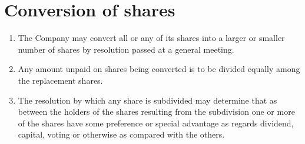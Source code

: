 \section{Conversion of shares}

\begin{enumerate}[label=(\alph*)]
    \item The Company may convert all or any of its shares into a larger or smaller number of shares by resolution passed at a general meeting.
    
    \item Any amount unpaid on shares being converted is to be divided equally among the replacement shares.
    
    \item The resolution by which any share is subdivided may determine that as between the holders of the shares resulting from the subdivision one or more of the shares have some preference or special advantage as regards dividend, capital, voting or otherwise as compared with the others.
\end{enumerate} 
